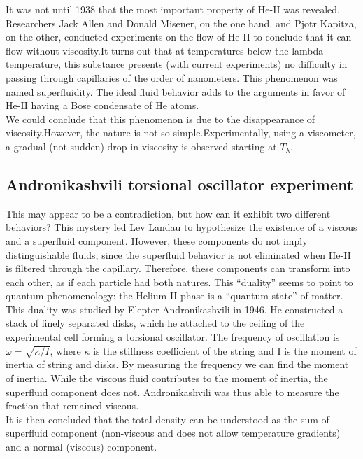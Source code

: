 \documentclass{article}
\begin{document}
It was not until 1938 that the most important property of He-II was revealed.
Researchers Jack Allen and Donald Misener, on the one hand, and Pjotr Kapitza, on the other, conducted experiments on the flow of He-II to conclude that it can flow without viscosity.It turns out that at temperatures below the lambda temperature, this substance presents (with current experiments) no difficulty in passing through capillaries of the order of nanometers. This phenomenon was named superfluidity. The ideal fluid behavior adds to the arguments in favor of He-II having a Bose condensate of He atoms.
\\

We could conclude that this phenomenon is due to the disappearance of viscosity.However, the nature is not so simple.Experimentally, using a viscometer, a gradual (not sudden) drop in viscosity is observed starting at $T_\lambda$.
\\

\subsection{Andronikashvili torsional oscillator experiment}

This may appear to be a contradiction, but how can it exhibit two different behaviors? This mystery led Lev Landau to hypothesize the existence of a viscous and a superfluid component. However, these components do not imply distinguishable fluids, since the superfluid behavior is not eliminated when He-II is filtered through the capillary. Therefore, these components can transform into each other, as if each particle had both natures. This “duality” seems to point to quantum phenomenology: the Helium-II phase is a “quantum state” of matter.
\\

This duality was studied by Elepter Andronikashvili in 1946. He constructed a stack of finely separated disks, which he attached to the ceiling of the experimental cell forming a torsional oscillator. The frequency of oscillation is $\omega = \sqrt{\kappa/I}$, where $\kappa$ is the stiffness coefficient of the string and I is the moment of inertia of string and disks. By measuring the frequency we can find the moment of inertia. While the viscous fluid contributes to the moment of inertia, the superfluid component does not. Andronikashvili was thus able to measure the fraction that remained viscous.
\\

It is then concluded that the total density can be understood as the sum of superfluid component (non-viscous and does not allow temperature gradients) and a normal (viscous) component.
\\
\end{document}
